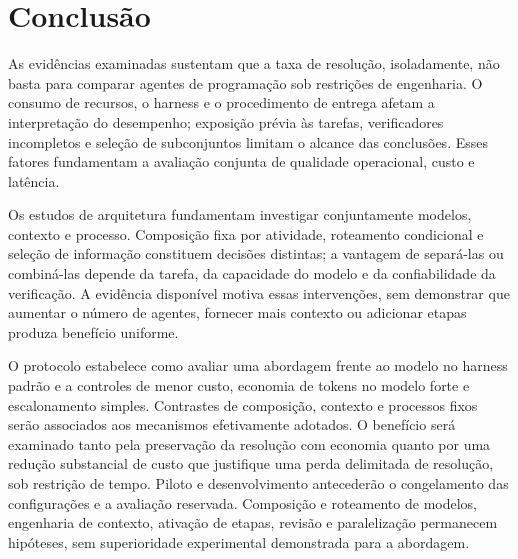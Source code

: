 \section{Conclusão}

As evidências examinadas sustentam que a taxa de resolução, isoladamente, não basta para comparar agentes de programação sob restrições de engenharia. O consumo de recursos, o harness e o procedimento de entrega afetam a interpretação do desempenho; exposição prévia às tarefas, verificadores incompletos e seleção de subconjuntos limitam o alcance das conclusões. Esses fatores fundamentam a avaliação conjunta de qualidade operacional, custo e latência.

Os estudos de arquitetura fundamentam investigar conjuntamente modelos, contexto e processo. Composição fixa por atividade, roteamento condicional e seleção de informação constituem decisões distintas; a vantagem de separá-las ou combiná-las depende da tarefa, da capacidade do modelo e da confiabilidade da verificação. A evidência disponível motiva essas intervenções, sem demonstrar que aumentar o número de agentes, fornecer mais contexto ou adicionar etapas produza benefício uniforme.

O protocolo estabelece como avaliar uma abordagem frente ao modelo no harness padrão e a controles de menor custo, economia de tokens no modelo forte e escalonamento simples. Contrastes de composição, contexto e processos fixos serão associados aos mecanismos efetivamente adotados. O benefício será examinado tanto pela preservação da resolução com economia quanto por uma redução substancial de custo que justifique uma perda delimitada de resolução, sob restrição de tempo. Piloto e desenvolvimento antecederão o congelamento das configurações e a avaliação reservada. Composição e roteamento de modelos, engenharia de contexto, ativação de etapas, revisão e paralelização permanecem hipóteses, sem superioridade experimental demonstrada para a abordagem.
